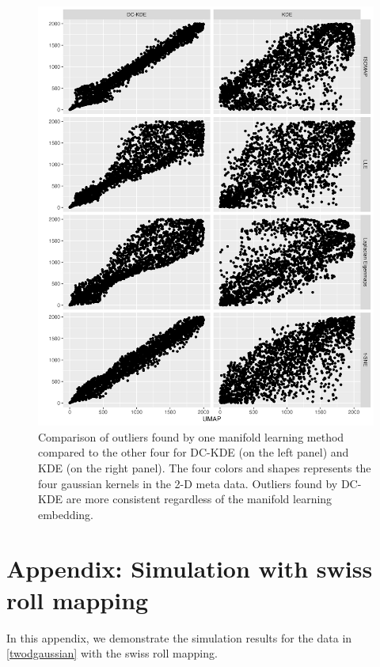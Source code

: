 \documentclass[11pt,a4paper,]{article}
\begin{document}
\begin{figure}

{\centering \includegraphics[width=0.95\linewidth]{figures/Twin Peak2000_density_compare_umapvs4ml_radius8_r0_5_rank} 

}

\caption{Comparison of outliers found by one manifold learning method compared to the other four for DC-KDE (on the left panel) and KDE (on the right panel). The four colors and shapes represents the four gaussian kernels in the 2-D meta data. Outliers found by DC-KDE are more consistent regardless of the manifold learning embedding.}\label{fig:tpllevs4ml-4}
\end{figure}

\hypertarget{swissrollappe}{%
\section{Appendix: Simulation with swiss roll mapping}\label{swissrollappe}}

In this appendix, we demonstrate the simulation results for the data in \autoref{twodgaussian} with the swiss roll mapping.
\end{document}
